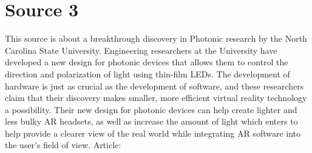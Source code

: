 \documentclass{article}
\begin{document}
\section{Source 3}
This source is about a breakthrough discovery in Photonic research by the North Carolina State University. Engineering researchers at the University have developed a new design for photonic devices that allows them to control the direction and polarization of light using thin-film LEDs. The development of hardware is just as crucial as the development of software, and these researchers claim that their discovery makes smaller, more efficient virtual reality technology a possibility. Their new design for photonic devices can help create lighter and less bulky AR headsets, as well as increase the amount of light which enters to help provide a clearer view of the real world while integrating AR software into the user's field of view.
Article: \cite{edsgcl.65176928220210221}



\end{document}
